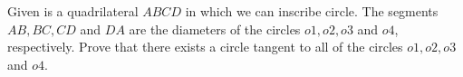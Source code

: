 Given is a quadrilateral $ABCD$ in which we can inscribe circle. The segments $AB, BC, CD$ and $DA$ are the diameters of the circles $o1, o2, o3$ and $o4$, respectively. Prove that there exists a circle tangent to all of the circles $o1, o2, o3$ and $o4$.